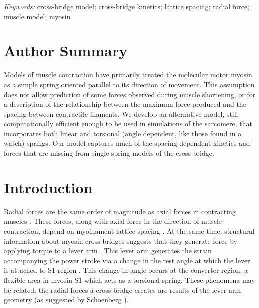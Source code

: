 \documentclass[10pt]{article}
\newcommand{\citep}[1]{\cite{#1}} %
\begin{document}
\emph{Keywords:} cross-bridge model; cross-bridge kinetics; lattice spacing; radial force; muscle model; myosin 


\section*{Author Summary} %
Models of muscle contraction have primarily treated the molecular motor myosin as a simple spring oriented parallel to its direction of movement. 
This assumption does not allow prediction of some forces observed during muscle shortening, or for a description of the relationship between the maximum force produced and the spacing between contractile filaments. 
We develop an alternative model, still computationally efficient enough to be used in simulations of the sarcomere, that incorporates both linear and torsional (angle dependent, like those found in a watch) springs. 
Our model captures much of the spacing dependent kinetics and forces that are missing from single-spring models of the cross-bridge.


\section*{Introduction} %

Radial forces are the same order of magnitude as axial forces in contracting muscles \citep{Maughan1981, Cecchi1990, Millman1998}. 
These forces, along with axial force in the direction of muscle contraction, depend on myofilament lattice spacing \citep{Bagni1994, Fuchs2005}. 
At the same time, structural information about myosin cross-bridges suggests that they generate force by applying torque to a lever arm \citep{Rayment1993, Uyeda1996, Huxley2000}.
This lever arm generates the strain accompanying the power stroke via a change in the rest angle at which the lever is attached to S1 region \citep{Huxley2000, Houdusse2001}. 
This change in angle occurs at the converter region, a flexible area in myosin S1 which acts as a torsional spring. 
These phenomena may be related: the radial forces a cross-bridge creates are results of the lever arm geometry (as suggested by Schoenberg \citep{Schoenberg1980b}). 
\end{document}

